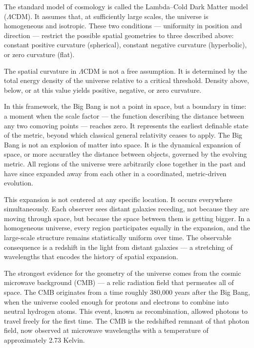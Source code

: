 The standard model of cosmology is called the Lambda–Cold Dark Matter model ($\Lambda$CDM). It assumes that, at sufficiently large scales, the universe is homogeneous and isotropic. These two conditions — uniformity in position and direction — restrict the possible spatial geometries to three described above: constant positive curvature (spherical), constant negative curvature (hyperbolic), or zero curvature (flat). 

The spatial curvature in $\Lambda$CDM is not a free assumption. It is determined by the total energy density of the universe relative to a critical threshold. Density above, below, or at this value yields positive, negative, or zero curvature.

In this framework, the Big Bang is not a point in space, but a boundary in time: a moment when the scale factor — the function describing the distance between any two comoving points — reaches zero. It represents the earliest definable state of the metric, beyond which classical general relativity ceases to apply. The Big Bang is not an explosion of matter into space. It is the dynamical expansion of space, or more accuratley the distance between objects, governed by the evolving metric. All regions of the universe were arbitrarily close together in the past and have since expanded away from each other in a coordinated, metric-driven evolution.

This expansion is not centered at any specific location. It occurs everywhere simultaneously. Each observer sees distant galaxies receding, not because they are moving through space, but because the space between them is getting bigger. In a homogeneous universe, every region participates equally in the expansion, and the large-scale structure remains statistically uniform over time. The observable consequence is a redshift in the light from distant galaxies — a stretching of wavelengths that encodes the history of spatial expansion.

The strongest evidence for the geometry of the universe comes from the cosmic microwave background (CMB) — a relic radiation field that permeates all of space. The CMB originates from a time roughly 380,000 years after the Big Bang, when the universe cooled enough for protons and electrons to combine into neutral hydrogen atoms. This event, known as recombination, allowed photons to travel freely for the first time. The CMB is the redshifted remnant of that photon field, now observed at microwave wavelengths with a temperature of approximately 2.73 Kelvin.

